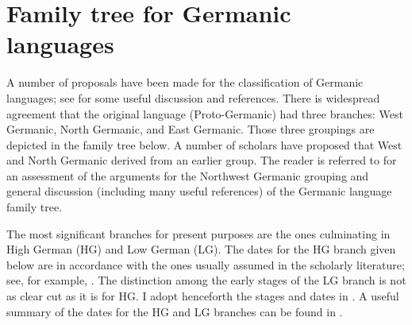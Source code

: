 \chapter{Family tree for Germanic languages}\label{appendix:e}

A number of proposals have been made for the classification of Germanic languages; see \citet{Robinson1992} for some useful discussion and references. There is widespread agreement that the original language (Proto-Germanic) had three branches: West Germanic, North Germanic, and East Germanic. Those three groupings are depicted in the family tree below. A number of scholars have proposed that West and North Germanic derived from an earlier  group. The reader is referred to \citet[22ff.]{Fulk2018} for an assessment of the arguments for the Northwest Germanic grouping and general discussion (including many useful references) of the Germanic language family tree.

The most significant branches for present purposes are the ones culminating in High German (HG) and Low German (LG). The dates for the HG branch given below are in accordance with the ones usually assumed in the scholarly literature; see, for example, \citet[9--10]{Paul2007}. The distinction among the early stages of the LG branch is not as clear cut as it is for HG. I adopt henceforth the stages and dates in \citet{Foerste1957}. A useful summary of the dates for the HG and LG branches can be found in \citet[16--22]{Schmidt2007}. 

